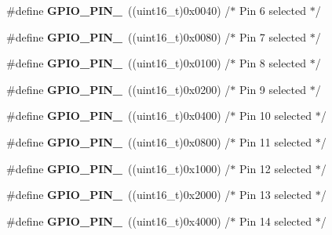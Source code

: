 \begin{DoxyCompactItemize}
\#define {\bfseries G\+P\+I\+O\+\_\+\+P\+I\+N\+\_}~((uint16\+\_\+t)0x0040)  /$\ast$ Pin 6 selected    $\ast$/
\item 
\mbox{\label{group___g_p_i_o__pins__define_ga482cb86c2f036e630661a41e8986bcfe}} 
\#define {\bfseries G\+P\+I\+O\+\_\+\+P\+I\+N\+\_}~((uint16\+\_\+t)0x0080)  /$\ast$ Pin 7 selected    $\ast$/
\item 
\mbox{\label{group___g_p_i_o__pins__define_gaf5eb6a42a4428e236bd4fd08ade71e7a}} 
\#define {\bfseries G\+P\+I\+O\+\_\+\+P\+I\+N\+\_}~((uint16\+\_\+t)0x0100)  /$\ast$ Pin 8 selected    $\ast$/
\item 
\mbox{\label{group___g_p_i_o__pins__define_ga4c503cb4a0dc0d18261080051d9c2daf}} 
\#define {\bfseries G\+P\+I\+O\+\_\+\+P\+I\+N\+\_}~((uint16\+\_\+t)0x0200)  /$\ast$ Pin 9 selected    $\ast$/
\item 
\mbox{\label{group___g_p_i_o__pins__define_gac102c0123cb8bcadc5b590cd940b9e20}} 
\#define {\bfseries G\+P\+I\+O\+\_\+\+P\+I\+N\+\_}~((uint16\+\_\+t)0x0400)  /$\ast$ Pin 10 selected   $\ast$/
\item 
\mbox{\label{group___g_p_i_o__pins__define_ga79f6797ea82c1fb25cd6c0e14e44d312}} 
\#define {\bfseries G\+P\+I\+O\+\_\+\+P\+I\+N\+\_}~((uint16\+\_\+t)0x0800)  /$\ast$ Pin 11 selected   $\ast$/
\item 
\mbox{\label{group___g_p_i_o__pins__define_ga95f9ce5911fa8b209defb969db93ced3}} 
\#define {\bfseries G\+P\+I\+O\+\_\+\+P\+I\+N\+\_}~((uint16\+\_\+t)0x1000)  /$\ast$ Pin 12 selected   $\ast$/
\item 
\mbox{\label{group___g_p_i_o__pins__define_ga173023dced8f9692ade0f1176558ef70}} 
\#define {\bfseries G\+P\+I\+O\+\_\+\+P\+I\+N\+\_}~((uint16\+\_\+t)0x2000)  /$\ast$ Pin 13 selected   $\ast$/
\item 
\mbox{\label{group___g_p_i_o__pins__define_ga315b4dc1a0c1f9021b3d3a8fe9ccc0c3}} 
\#define {\bfseries G\+P\+I\+O\+\_\+\+P\+I\+N\+\_}~((uint16\+\_\+t)0x4000)  /$\ast$ Pin 14 selected   $\ast$/

\end{DoxyCompactItemize}
